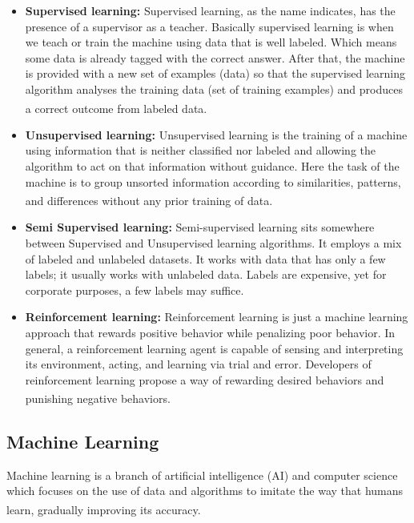 \begin{itemize}
    \item \textbf{Supervised learning:}
        Supervised learning, as the name indicates, has the presence of a supervisor as a teacher. Basically supervised learning is when we teach or train the machine using data that is well labeled. Which means some data is already tagged with the correct answer. After that, the machine is provided with a new set of examples (data) so that the supervised learning algorithm analyses the training data (set of training examples) and produces a correct outcome from labeled data. \textsuperscript{\cite{AITypes-GeeksForGeeks}}

    \item \textbf{Unsupervised learning:}
        Unsupervised learning is the training of a machine using information that is neither classified nor labeled and allowing the algorithm to act on that information without guidance. Here the task of the machine is to group unsorted information according to similarities, patterns, and differences without any prior training of data. \textsuperscript{\cite{AITypes-GeeksForGeeks}}

    \vspace{0.2in}

    

    \item \textbf{Semi Supervised learning:}
        Semi-supervised learning sits somewhere between Supervised and Unsupervised learning algorithms. It employs a mix of labeled and unlabeled datasets. It works with data that has only a few labels; it usually works with unlabeled data. Labels are expensive, yet for corporate purposes, a few labels may suffice.
    \item \textbf{Reinforcement learning:}
        Reinforcement learning is just a machine learning approach that rewards positive behavior while penalizing poor behavior. In general, a reinforcement learning agent is capable of sensing and interpreting its environment, acting, and learning via trial and error. Developers of reinforcement learning propose a way of rewarding desired behaviors and punishing negative behaviors. \textsuperscript{\cite{SSLvsRL-askanydifference}}

    \vspace{0.2in}

    
\end{itemize}

\subsection{Machine Learning}
Machine learning is a branch of artificial intelligence (AI) and computer science which focuses on the use of data and algorithms to imitate the way that humans learn, gradually improving its accuracy. \textsuperscript{\cite{ML-IBM}}

